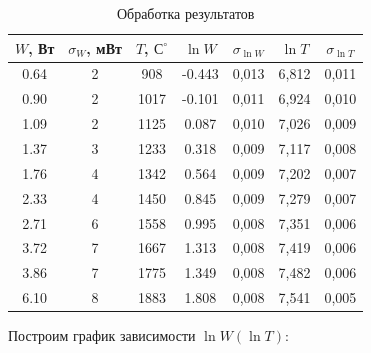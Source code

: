 \documentclass[a4paper,12pt]{extarticle}
\begin{document}
\begin{table}[H]
\centering
\begin{tabular}{|c|c|c|c|c|c|c|}
\hline
$W$, Вт&  $\sigma_W$, мВт & $T$, $\text{С}^{\circ}$ & $\ln W$  & $\sigma_{\ln W}$ & $\ln T$  & $\sigma_{\ln T}$ \\ \hline
0.64& 2 & 908   & -0.443& 0,013      & 6,812 & 0,011      \\ \hline
0.90& 2 & 1017  & -0.101& 0,011      & 6,924 & 0,010      \\ \hline
1.09& 2 & 1125  & 0.087& 0,010      & 7,026 & 0,009      \\ \hline
1.37& 3 & 1233  & 0.318& 0,009      & 7,117 & 0,008      \\ \hline
1.76& 4 & 1342  & 0.564& 0,009      & 7,202 & 0,007      \\ \hline
2.33& 4 & 1450  & 0.845& 0,009      & 7,279 & 0,007      \\ \hline
2.71& 6 & 1558  & 0.995& 0,008      & 7,351 & 0,006      \\ \hline
3.72& 7 & 1667  & 1.313& 0,008      & 7,419 & 0,006      \\ \hline
3.86& 7 & 1775  & 1.349& 0,008      & 7,482 & 0,006      \\ \hline
6.10& 8 & 1883  & 1.808& 0,008      & 7,541 & 0,005      \\ \hline
\end{tabular}
\caption{Обработка результатов}
\end{table}
Построим график зависимости $\ln W (\ln T)$:

\begin{minipage}{1\textwidth}
    \centering
    \end{minipage}
\end{document}
